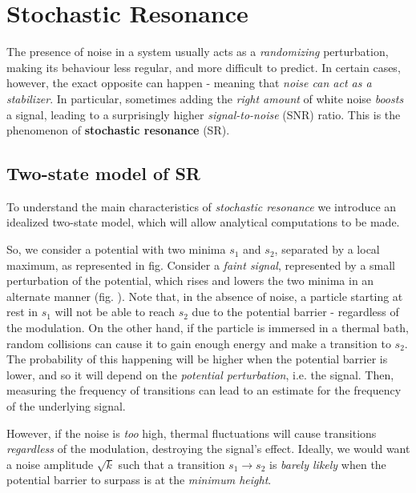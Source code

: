 \documentclass[../template.tex]{subfiles}
\begin{document}
\chapter{Stochastic Resonance}
The presence of noise in a system usually acts as a \textit{randomizing} perturbation, making its behaviour less regular, and more difficult to predict. In certain cases, however, the exact opposite can happen - meaning that \textit{noise can act as a stabilizer}. In particular, sometimes adding the \textit{right amount} of white noise \textit{boosts} a signal, leading  to a surprisingly higher \textit{signal-to-noise} (SNR) ratio. This is the phenomenon of \textbf{stochastic resonance} (SR).   

\section{Two-state model of SR}
To understand the main characteristics of \textit{stochastic resonance} we introduce an idealized two-state model, which will allow analytical computations to be made. 

\medskip

So, we consider a potential with two minima $s_1$ and $s_2$, separated by a local maximum, as represented in fig. %
Consider a \textit{faint signal}, represented by a small perturbation of the potential, which rises and lowers the two minima in an alternate manner (fig. ). %
Note that, in the absence of noise, a particle starting at rest in $s_1$ will not be able to reach $s_2$ due to the potential barrier - regardless of the modulation. On the other hand, if the particle is immersed in a thermal bath, random collisions can cause it to gain enough energy and make a transition to $s_2$. The probability of this happening will be higher when the potential barrier is lower, and so it will depend on the \textit{potential perturbation}, i.e. the signal. Then, measuring the frequency of transitions can lead to an estimate for the frequency of the underlying signal. 

However, if the noise is \textit{too} high, thermal fluctuations will cause transitions \textit{regardless} of the modulation, destroying the signal's effect. Ideally, we would want a noise amplitude $\sqrt{k}$ such that a transition $s_1 \to s_2$ is \textit{barely likely} when the potential barrier to surpass is at the \textit{minimum height}. 

\medskip
\end{document}
